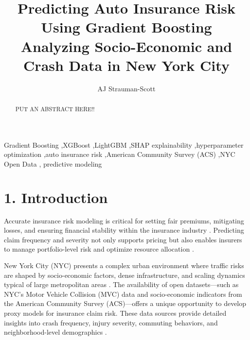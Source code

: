 \documentclass[
  number,
  review,
  3p]{elsarticle}
\begin{document}
\begin{frontmatter}
\title{Predicting Auto Insurance Risk Using Gradient
Boosting \\\large{Analyzing Socio-Economic and Crash Data in New York
City} }
\author[1]{AJ Strauman-Scott%
%
}



        
\begin{abstract}
PUT AN ABSTRACT HERE!!
\end{abstract}





\begin{keyword}
    Gradient Boosting \sep XGBoost \sep LightGBM \sep SHAP
explainability \sep hyperparameter optimization \sep auto insurance
risk \sep American Community Survey (ACS) \sep NYC Open Data \sep 
    predictive modeling
\end{keyword}
\end{frontmatter}
    

\section{1. Introduction}\label{introduction}

Accurate insurance risk modeling is critical for setting fair premiums,
mitigating losses, and ensuring financial stability within the insurance
industry \citep{henckaerts, clemente}. Predicting claim frequency and
severity not only supports pricing but also enables insurers to manage
portfolio-level risk and optimize resource allocation \citep{mohamed}.

New York City (NYC) presents a complex urban environment where traffic
risks are shaped by socio-economic factors, dense infrastructure, and
scaling dynamics typical of large metropolitan areas
\citep{cabrera, bettencourt}. The availability of open datasets---such
as NYC's Motor Vehicle Collision (MVC) data and socio-economic
indicators from the American Community Survey (ACS)---offers a unique
opportunity to develop proxy models for insurance claim risk. These data
sources provide detailed insights into crash frequency, injury severity,
commuting behaviors, and neighborhood-level demographics
\citep{adeniyi, brubacher}.
\end{document}
